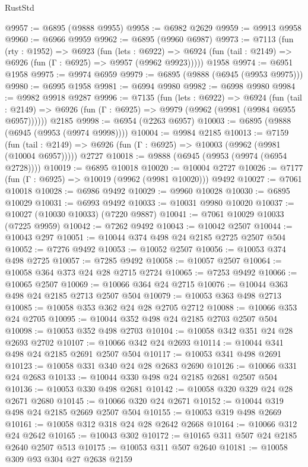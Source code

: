 \begin{lexlean}{RustStd}
\begin{coremodule}
@9957 := @6895 (@9888 @9955)
@9958 := @6982 @2629
@9959 := @9913 @9958
@9960 := @6966 @9959
@9962 := @6895 (@9960 @6987)
@9973 := @7113
    (fun (rty : @1952) =>
    @6923
      (fun (lets : @6922) =>
      @6924 (fun (tail : @2149) => @6926 (fun (Γ : @6925) => @9957 (@9962 @9923)))))
    @1958
@9974 := @6951 @1958
@9975 := @9974 @6959
@9979 := @6895 (@9888 (@6945 (@9953 @9975)))
@9980 := @6995 @1958
@9981 := @6994 @9980
@9982 := @6998 @9980
@9984 := @9982 @9918 @9287
@9996 := @7135
    (fun (lets : @6922) =>
    @6924
      (fun (tail : @2149) => @6926 (fun (Γ : @6925) => @9979 (@9962 (@9981 (@9984 @6955 @6957))))))
    @2185
@9998 := @6954 (@2263 @6957)
@10003 := @6895 (@9888 (@6945 (@9953 (@9974 @9998))))
@10004 := @9984 @2185
@10013 := @7159
    (fun (tail : @2149) => @6926 (fun (Γ : @6925) => @10003 (@9962 (@9981 (@10004 @6957)))))
    @2727
@10018 := @9888 (@6945 (@9953 (@9974 (@6954 @2728))))
@10019 := @6895 @10018
@10020 := @10004 @2727
@10026 := @7177 (fun (Γ : @6925) => @10019 (@9962 (@9981 @10020))) @9492
@10027 := @7061 @10018
@10028 := @6986 @9492
@10029 := @9960 @10028
@10030 := @6895 @10029
@10031 := @6993 @9492
@10033 := @10031 @9980 @10020
@10037 := @10027 (@10030 @10033) (@7220 @9887)
@10041 := @7061 @10029 @10033 (@7225 @9959)
@10042 := @7262 @9492
@10043 := @10042 @2507
@10044 := @10043 @297
@10051 := @10044 @374 @498 @24 @2185 @2725 @2507 @504
@10052 := @7276 @9492
@10053 := @10052 @2507
@10056 := @10053 @374 @498 @2725
@10057 := @7285 @9492
@10058 := @10057 @2507
@10064 := @10058 @364 @373 @24 @28 @2715 @2724
@10065 := @7253 @9492
@10066 := @10065 @2507
@10069 := @10066 @364 @24 @2715
@10076 := @10044 @363 @498 @24 @2185 @2713 @2507 @504
@10079 := @10053 @363 @498 @2713
@10085 := @10058 @353 @362 @24 @28 @2705 @2712
@10088 := @10066 @353 @24 @2705
@10095 := @10044 @352 @498 @24 @2185 @2703 @2507 @504
@10098 := @10053 @352 @498 @2703
@10104 := @10058 @342 @351 @24 @28 @2693 @2702
@10107 := @10066 @342 @24 @2693
@10114 := @10044 @341 @498 @24 @2185 @2691 @2507 @504
@10117 := @10053 @341 @498 @2691
@10123 := @10058 @331 @340 @24 @28 @2683 @2690
@10126 := @10066 @331 @24 @2683
@10133 := @10044 @330 @498 @24 @2185 @2681 @2507 @504
@10136 := @10053 @330 @498 @2681
@10142 := @10058 @320 @329 @24 @28 @2671 @2680
@10145 := @10066 @320 @24 @2671
@10152 := @10044 @319 @498 @24 @2185 @2669 @2507 @504
@10155 := @10053 @319 @498 @2669
@10161 := @10058 @312 @318 @24 @28 @2642 @2668
@10164 := @10066 @312 @24 @2642
@10165 := @10043 @302
@10172 := @10165 @311 @507 @24 @2185 @2640 @2507 @513
@10175 := @10053 @311 @507 @2640
@10181 := @10058 @309 @93 @304 @27 @2638 @2159

\end{coremodule}
\end{lexlean}
